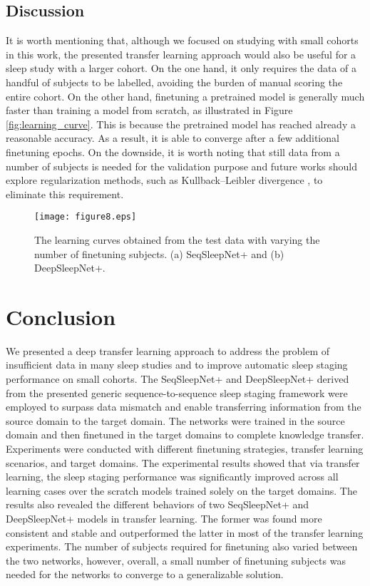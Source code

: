 \documentclass[journal,twoside,web]{ieeecolor}
\begin{document}
\vspace{-0.25cm}
\subsection{Discussion}
It is worth mentioning that, although we focused on studying with small cohorts in this work, the presented transfer learning approach would also be useful for a sleep study with a larger cohort. On the one hand, it only requires the data of a handful of subjects to be labelled, avoiding the burden of manual scoring the entire cohort. On the other hand, finetuning a pretrained model is generally much faster than training a model from scratch, as illustrated in Figure \ref{fig:learning_curve}. This is because the pretrained model has reached already a reasonable accuracy. As a result, it is able to converge after a few additional finetuning epochs. On the downside, it is worth noting that still data from a number of subjects is needed for the validation purpose and future works should explore regularization methods, such as Kullback–Leibler divergence \cite{Phan2020a}, to eliminate this requirement.

\begin{figure} [!t]
	\centering
	\texttt{[image: figure8.eps]}
	\caption{The learning curves obtained from the test data with varying the number of finetuning subjects. (a) SeqSleepNet+ and (b) DeepSleepNet+.}
	\label{fig:influence_nosub}
	\vspace{-0.25cm}
\end{figure}
\vspace{-0.25cm}
\section{Conclusion}
We presented a deep transfer learning approach to address the problem of insufficient data in many sleep studies and to improve automatic sleep staging performance on small cohorts. The SeqSleepNet+ and DeepSleepNet+ derived from the presented generic sequence-to-sequence sleep staging framework were employed to surpass data mismatch and enable transferring information from the source domain to the target domain. The networks were trained in the source domain and then finetuned in the target domains to complete knowledge transfer. Experiments were conducted with different finetuning strategies, transfer learning scenarios, and target domains. The experimental results showed that via transfer learning, the sleep staging performance was significantly improved across all learning cases over the scratch models trained solely on the target domains. The results also revealed the different behaviors of two SeqSleepNet+ and DeepSleepNet+ models in transfer learning. The former was found more consistent and stable and outperformed the latter in most of the transfer learning experiments. The number of subjects required for finetuning also varied between the two networks, however, overall, a small number of finetuning subjects was needed for the networks to converge to a generalizable solution.
\end{document}
